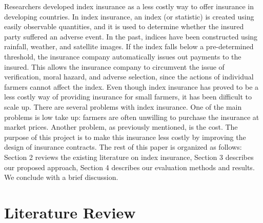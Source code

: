 \documentclass[11pt]{article}
\begin{document}
Researchers developed index insurance as a less costly way to offer insurance in developing countries. In index insurance, an index (or statistic) is created using easily observable quantities, and it is used to determine whether the insured party suffered an adverse event. In the past, indices have been constructed using rainfall, weather, and satellite images. If the index falls below a pre-determined threshold, the insurance company automatically issues out payments to the insured. This allows the insurance company to circumvent the issue of verification, moral hazard, and adverse selection, since the actions of individual farmers cannot affect the index. Even though index insurance has proved to be a less costly way of providing insurance for small farmers, it has been difficult to scale up. There are several problems with index insurance. One of the main problems is low take up: farmers are often unwilling to purchase the insurance at market prices. Another problem, as previously mentioned, is the cost. The purpose of this project is to make this insurance less costly by improving the design of insurance contracts. The rest of this paper is organized as follows: Section 2 reviews the existing literature on index insurance, Section 3 describes our proposed approach, Section 4 describes our evaluation methods and results. We conclude with a brief discussion. 

\section{Literature Review}
\end{document}
